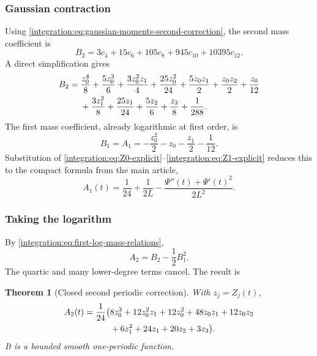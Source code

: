 \documentclass[11pt,oneside]{article}
\newtheorem{theorem}{Theorem}[section]
\theoremstyle{definition}
\theoremstyle{remark}
\begin{document}
\subsubsection{Gaussian contraction}

Using \eqref{integration:eq:gaussian-moments-second-correction}, the second mass coefficient is
\begin{equation}
 B_2=3c_4+15c_6+105c_8+945c_{10}+10395c_{12}.
 \label{integration:eq:B2-contraction}
\end{equation}
A direct simplification gives
\begin{align}
 B_2={}&\frac{z_0^4}{8}+\frac{5z_0^3}{6}
 +\frac{3z_0^2z_1}{4}+\frac{25z_0^2}{24}
 +\frac{5z_0z_1}{2}+\frac{z_0z_2}{2}+\frac{z_0}{12}
 \notag\\
 &+\frac{3z_1^2}{8}+\frac{25z_1}{24}
 +\frac{5z_2}{6}+\frac{z_3}{8}+\frac1{288}.                \label{integration:eq:B2-explicit}
\end{align}
The first mass coefficient, already logarithmic at first order, is
\begin{equation}
 B_1=A_1=-\frac{z_0^2}{2}-z_0-\frac{z_1}{2}-\frac1{12}.
 \label{integration:eq:A1-jets}
\end{equation}
Substitution of \eqref{integration:eq:Z0-explicit}--\eqref{integration:eq:Z1-explicit} reduces this to the compact
formula from the main article,
\begin{equation}
 A_1(t)=\frac1{24}+\frac1{2L}
 -\frac{\Psi''(t)+\Psi'(t)^2}{2L^2}.
 \label{integration:eq:A1-Psi}
\end{equation}

\subsubsection{Taking the logarithm}

By \eqref{integration:eq:first-log-mass-relations},
\begin{equation}
 A_2=B_2-\frac12B_1^2.
 \label{integration:eq:A2-from-B}
\end{equation}
The quartic and many lower-degree terms cancel.  The result is

\begin{theorem}[Closed second periodic correction]
\label{integration:thm:closed-second-correction}
With $z_j=Z_j(t)$,
\begin{align}
 A_2(t)=\frac1{24}\bigl(&8z_0^3+12z_0^2z_1+12z_0^2
 +48z_0z_1+12z_0z_2\notag\\
 &+6z_1^2+24z_1+20z_2+3z_3\bigr).                          \label{integration:eq:A2-jets}
\end{align}
It is a bounded smooth one-periodic function.
\end{theorem}
\end{document}
